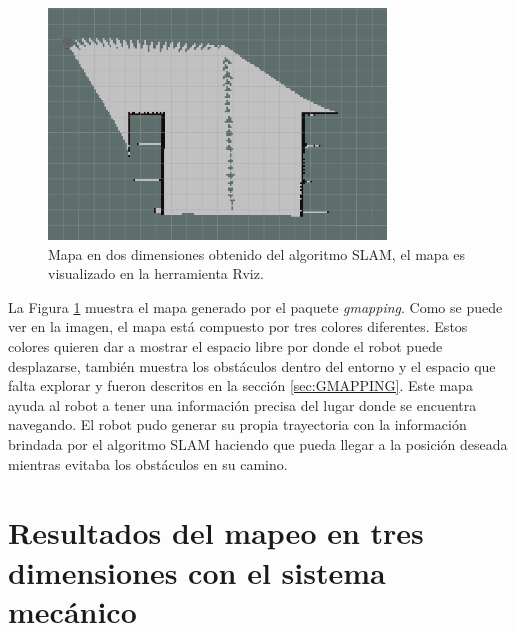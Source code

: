 \begin{figure}
  \centering \footnotesize
  \includegraphics[width=0.80\textwidth]{images/map_slam.png}
  \captionsetup{font=footnotesize}
  \caption{Mapa en dos dimensiones obtenido del algoritmo SLAM, el mapa es 
  visualizado en la herramienta Rviz.}
  \label{fig:SLAM_2D}
\end{figure}

La Figura \ref{fig:SLAM_2D} muestra el mapa generado por el paquete \textit{gmapping}. Como 
se puede ver en la imagen, el mapa está compuesto por tres colores diferentes. Estos
colores quieren dar a mostrar el espacio libre por donde el robot puede desplazarse, 
también muestra los obstáculos dentro del entorno y el espacio que falta explorar y 
fueron descritos en la sección \ref{sec:GMAPPING}. Este mapa ayuda al robot
a tener una información precisa del lugar donde se encuentra navegando. El robot pudo
generar su propia trayectoria con la información brindada por el algoritmo SLAM haciendo
que pueda llegar a la posición deseada mientras evitaba los obstáculos en su camino.


\section{Resultados del mapeo en tres dimensiones con el sistema mecánico}

